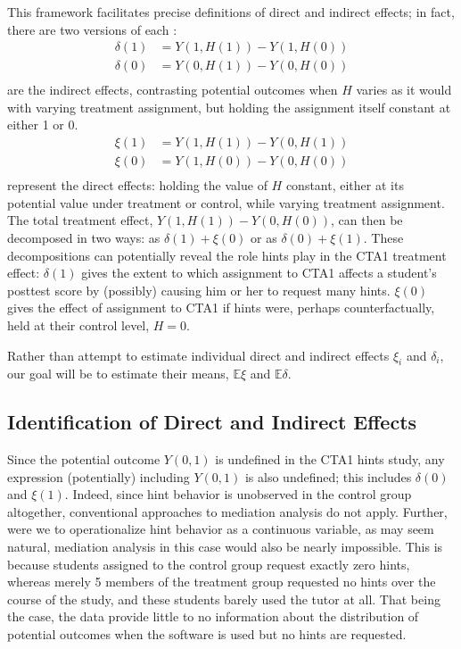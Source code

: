 \documentclass{article}\usepackage[]{graphicx}\usepackage[]{color}
\newcommand{\EE}{\mathbb{E}}
\begin{document}
This framework facilitates precise definitions of direct and indirect
effects; in fact, there are two versions of each \cite[e.g.][]{imai2011unpacking}:
\begin{align*}
\delta(1)&=Y(1,H(1))-Y(1,H(0))\\
\delta(0)&=Y(0,H(1))-Y(0,H(0))\\
\end{align*}
are the indirect effects, contrasting potential outcomes when $H$
varies as it would with varying treatment assignment, but holding the
assignment itself constant at either 1 or 0.
\begin{align*}
\xi(1)&=Y(1,H(1))-Y(0,H(1))\\
\xi(0)&=Y(1,H(0))-Y(0,H(0))\\
\end{align*}
represent the direct effects: holding the value of $H$ constant,
either at its potential value under treatment or control, while
varying treatment assignment.
The total treatment effect, $Y(1,H(1))-Y(0,H(0))$, can then be
decomposed in two ways: as $\delta(1)+\xi(0)$ or as
$\delta(0)+\xi(1)$.
These decompositions can potentially reveal the role hints play in the
CTA1 treatment effect: $\delta(1)$ gives the extent to which
assignment to CTA1 affects a student's posttest score by (possibly)
causing him or her to request many hints.
$\xi(0)$ gives the effect of assignment to CTA1 if hints were,
perhaps counterfactually, held at their control level, $H=0$.

Rather than attempt to estimate individual direct and indirect effects
$\xi_i$ and $\delta_i$, our goal will be to estimate their means,
$\EE \xi$ and $\EE \delta$.

\subsection{Identification of Direct and Indirect
  Effects}\label{sec:medID}

Since the potential outcome $Y(0,1)$ is undefined in the CTA1 hints
study, any expression (potentially) including $Y(0,1)$ is also
undefined; this includes $\delta(0)$ and $\xi(1)$.
Indeed, since hint behavior is unobserved in the control group
altogether, conventional approaches to mediation analysis do not
apply.
Further, were we to operationalize hint behavior as a continuous
variable, as may seem natural, mediation analysis in this case would
also be nearly impossible.
This is because students assigned to the control group request exactly
zero hints, whereas merely
5
members of the treatment group
requested no hints over the course of the study, and these students
barely used the tutor at all.
That being the case, the data provide little to no information about
the distribution of potential outcomes when the software is used
but no hints are requested.
\end{document}
